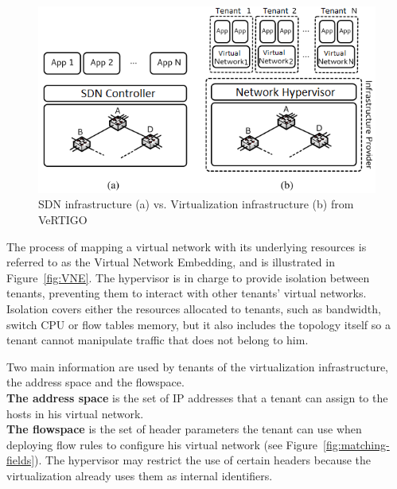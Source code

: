 \begin{figure}[h]
    \centering
    \includegraphics[scale=0.9]{figures/virt-archi.png}
    \caption{SDN infrastructure (a) vs. Virtualization infrastructure (b) from VeRTIGO~\cite{VeRTIGO-Corin2012a}}
    \label{fig:virt-archi}
\end{figure}


The process of mapping a virtual network with its underlying resources is referred to as the Virtual Network Embedding, and is illustrated in Figure~\ref{fig:VNE}.
The hypervisor is in charge to provide isolation between tenants, preventing them to interact with other tenants' virtual networks. Isolation covers either the resources allocated to tenants, such as bandwidth, switch CPU or flow tables memory, but it also includes the topology itself so a tenant cannot manipulate traffic that does not belong to him.

Two main information are used by tenants of the virtualization infrastructure, the address space and the flowspace.\\
\textbf{The address space} is the set of IP addresses that a tenant can assign to the hosts in his virtual network.\\
\textbf{The flowspace} is the set of header parameters the tenant can use when deploying flow rules to configure his virtual network (see Figure~\ref{fig:matching-fields}). The hypervisor may restrict the use of certain headers because the virtualization already uses them as internal identifiers.

